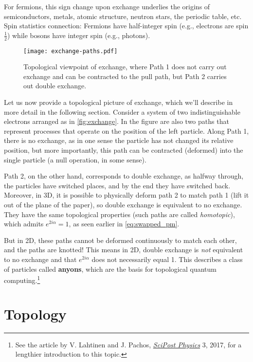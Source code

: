 \documentclass[12pt, english]{book}
\begin{document}
For fermions, this sign change upon exchange underlies the origins of semiconductors, metals, atomic structure, neutron stars, the periodic table, etc.
Spin statistics connection: Fermions have half-integer spin (e.g., electrons are spin $\frac{1}{2}$) while bosons have integer spin (e.g., photons).

\begin{figure}[!ht]
	\centering 
	\texttt{[image: exchange-paths.pdf]}
	\caption{Topological viewpoint of exchange, where Path 1 does not carry out exchange and can be contracted to the pull path, but Path 2 carries out double exchange.}
	\label{fig:exchange}
\end{figure}

Let us now provide a topological picture of exchange, which we'll describe in more detail in the following section.
Consider a system of two indistinguishable electrons arranged as in \autoref{fig:exchange}.
In the figure are also two paths that represent processes that operate on the position of the left particle.
Along Path 1, there is no exchange, as in one sense the particle has not changed its relative position, but more importantly, this path can be contracted (deformed) into the single particle (a null operation, in some sense).

Path 2, on the other hand, corresponds to double exchange, as halfway through, the particles have switched places, and by the end they have switched back.
Moreover, in 3D, it is possible to physically deform path 2 to match path 1 (lift it out of the plane of the paper), so double exchange is equivalent to no exchange.
They have the same topological properties (such paths are called \emph{homotopic}), which admits $e^{2 i \alpha} = 1$, as seen earlier in \autoref{eq:swapped_pm}.

But in 2D, these paths cannot be deformed continuously to match each other, and the paths are knotted!
This means in 2D, double exchange is \emph{not} equivalent to no exchange and that $e^{2 i \alpha}$ does not necessarily equal 1.
This describes a class of particles called \textbf{anyons}, which are the basis for topological quantum computing.\footnote{See the article by V. Lahtinen and J. Pachos, \href{https://arxiv.org/abs/1705.04103}{\emph{SciPost Physics}} 3, 2017, for a lengthier introduction to this topic.}



\section{Topology}
\end{document}
